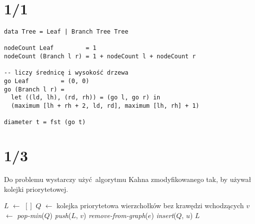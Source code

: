 \documentclass[a4paper, 12pt]{article}
\newcommand{\+}{\enspace}
\begin{document}
\newpage
\section*{1/1}


\begin{verbatim}
data Tree = Leaf | Branch Tree Tree

nodeCount Leaf         = 1
nodeCount (Branch l r) = 1 + nodeCount l + nodeCount r

-- liczy średnicę i wysokość drzewa
go Leaf         = (0, 0)
go (Branch l r) =
  let ((ld, lh), (rd, rh)) = (go l, go r) in
  (maximum [lh + rh + 2, ld, rd], maximum [lh, rh] + 1)

diameter t = fst (go t)

\end{verbatim}


\section*{1/3}
Do problemu wystarczy użyć algorytmu Kahna zmodyfikowanego tak, by
używał kolejki priorytetowej.

\begin{algorithm}
	\begin{algorithmic}
		\State $L$ $←$ $[]$
		\State $Q$ $←$ kolejka priorytetowa wierzchołków bez krawędzi wchodzących
			\State $v$ $←$ \textit{pop-min}($Q$)
			\State \textit{push}($L$, $v$)
				\State \textit{remove-from-graph}($e$)
					\State \textit{insert}($Q$, $u$)
				\EndIf
			\EndFor
		\EndWhile
		\State \Return $L$
	\end{algorithmic}
\end{algorithm}
\end{document}
